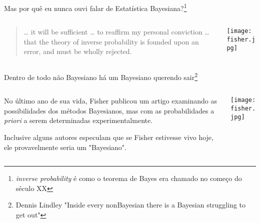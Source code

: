 \begin{frame}{Mas por quê eu nunca ouvi falar de Estatística Bayesiana?\footnote{\textit{inverse probability} é como o teorema de Bayes era chamado no começo do século XX}}
    \begin{columns}
        \begin{column}{0.8\textwidth}
            \begin{quotation}
                … it will be sufficient … to reaffirm my personal conviction …
                that the theory of inverse probability is founded upon an error,
                and must be wholly rejected.
            \end{quotation}
            \vfill \vfill
            \textcite{fisher1925statistical}
        \end{column}
        \begin{column}{0.2\textwidth}
            \centering
            \texttt{[image: fisher.jpg]}
        \end{column}
    \end{columns}
\end{frame}

\begin{frame}{Dentro de todo não Bayesiano há um Bayesiano querendo sair\footnote{Dennis Lindley "Inside every nonBayesian there is a Bayesian struggling to get out"}}
    \begin{columns}
        \begin{column}{0.8\textwidth}
            \begin{vfilleditems}
                \item No último ano de sua vida, Fisher publicou um artigo \parencite{fisherExamplesBayesMethod1962} examinando as possibilidades dos métodos Bayesianos, mas com as probabilidades a \textit{priori} a serem determinadas experimentalmente.
                \item Inclusive alguns autores especulam \parencite{jaynesProbabilityTheoryLogic2003} que se Fisher estivesse vivo hoje, ele provavelmente seria um "Bayesiano".
            \end{vfilleditems}
        \end{column}
        \begin{column}{0.2\textwidth}
            \centering
            \texttt{[image: fisher.jpg]}
        \end{column}
    \end{columns}
\end{frame}

